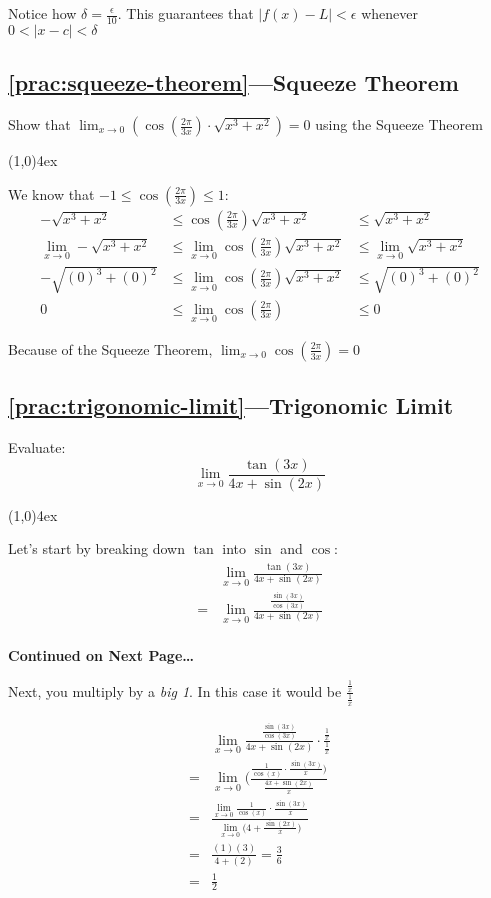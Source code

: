 \documentclass{MathNotes}
\newcommand{\continued}{
	\mbox{}
	\vfill
	\textbf{Continued on Next Page\ldots}\newpage
}
\newcommand{\br}{
	\begin{center}
		\line(1,0){4ex}
	\end{center}}
\begin{document}
Notice how $\delta=\frac{\epsilon}{10}$. This guarantees that
$\lvert f(x)-L \rvert < \epsilon$ whenever $0<\lvert x-c \rvert<\delta$

\subsection*{\ref{prac:squeeze-theorem}---Squeeze Theorem}\label{ans:squeeze-theorem}
Show that
$\displaystyle\lim_{x\to 0}(\cos(\frac{2\pi}{3x})\cdot\sqrt{x^3+x^2})=0$
using the Squeeze Theorem
\br
We know that $\displaystyle-1\leq\cos(\frac{2\pi}{3x})\leq 1$:
\begin{align*}
	-\sqrt{x^3+x^2}              & \leq\cos(\frac{2\pi}{3x})\sqrt{x^3+x^2} & \leq
	\sqrt{x^3+x^2}
	\\
	\lim_{x\to 0}-\sqrt{x^3+x^2} & \leq\lim_{x\to 0}\cos(\frac{2\pi}{3x})
	\sqrt{x^3+x^2}               & \leq\lim_{x\to 0}\sqrt{x^3+x^2}
	\\
	-\sqrt{(0)^3+(0)^2}          & \leq\lim_{x\to 0}\cos(\frac{2\pi}{3x})
	\sqrt{x^3+x^2}               & \leq\sqrt{(0)^3+(0)^2}
	\\
	0                            & \leq\lim_{x\to 0}\cos(\frac{2\pi}{3x})  & \leq0
\end{align*}

Because of the Squeeze Theorem, $\displaystyle\lim_{x\to 0}\cos(\frac{2\pi}{3x})=0$

\subsection*{\ref{prac:trigonomic-limit}---Trigonomic Limit}\label{ans:trigonomic-limit}
Evaluate:
$$\lim_{x\to 0}\frac{\tan(3x)}{4x+\sin(2x)}$$
\br

Let's start by breaking down $\tan$ into $\sin$ and $\cos$:
\begin{align*}
	  & \lim_{x\to 0}\frac{\tan(3x)}{4x+\sin(2x)}                  \\
	= & \lim_{x\to 0}\frac{\frac{\sin(3x)}{\cos(3x)}}{4x+\sin(2x)} \\
\end{align*}
\continued

Next, you multiply by a \textit{big 1}. In this case it would be
$\displaystyle\frac{\frac{1}{x}}{\frac{1}{x}}$

\begin{align*}
	  & \lim_{x\to 0}\frac{\frac{\sin(3x)}{\cos(3x)}}{4x+\sin(2x)}\cdot\frac{\frac{1}{x}}{\frac{1}{x}}            \\
	= & \lim_{x\to 0}\big(\frac{\frac{1}{\cos(x)}\cdot\frac{\sin(3x)}{x}\big)}{\frac{4x+\sin(2x)}{x}}             \\
	= & \frac{\lim_{x\to 0}\frac{1}{\cos(x)}\cdot\frac{\sin(3x)}{x}}{\lim_{x\to 0}\big(4+\frac{\sin(2x)}{x}\big)} \\
	= & \frac{(1)(3)}{4+(2)}=\frac{3}{6}                                                                          \\
	= & \frac{1}{2}
\end{align*}
\end{document}
